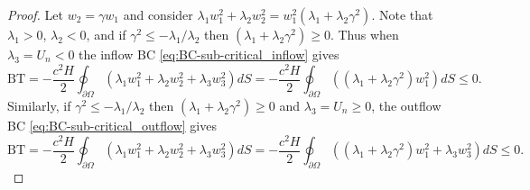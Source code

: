 \documentclass{article}
\numberwithin{equation}{section}
\newtheorem{lemma}{Lemma}
\theoremstyle{definition}
\begin{document}
\begin{proof}
   Let  $w_2 = \gamma w_1$ and consider
        $ \lambda_1 w_1^2 + \lambda_2 w_2^2     =  w_1^2 \left( \lambda_1  + \lambda_2 \gamma^2\right).$
    Note that $\lambda_1>0$, $\lambda_2<0$, and if  $ \gamma^2 \le -\lambda_1/\lambda_2$ then  $\left( \lambda_1  + \lambda_2 \gamma^2\right)\ge 0$. Thus when $\lambda_3 = U_n <0$ the inflow BC \eqref{eq:BC-sub-critical_inflow} gives
    $$
    \mathrm{BT}=-\frac{c^2H}{2}\oint_{\partial \Omega}
\left(\lambda_1 w_1^2 + \lambda_2 w_2^2 + \lambda_3 w_3^2 \right)dS =  -\frac{c^2H}{2}\oint_{\partial \Omega}
\left(\left( \lambda_1  + \lambda_2 \gamma^2\right) w_1^2\right)dS \le 0.
    $$
    Similarly, if  $ \gamma^2 \le -\lambda_1/\lambda_2$ then  $\left( \lambda_1  + \lambda_2 \gamma^2\right)\ge 0$ and  $\lambda_3 = U_n \ge 0$, the outflow BC \eqref{eq:BC-sub-critical_outflow} gives
     $$
    \mathrm{BT}=-\frac{c^2H}{2}\oint_{\partial \Omega}
\left(\lambda_1 w_1^2 + \lambda_2 w_2^2 + \lambda_3 w_3^2 \right)dS =  -\frac{c^2H}{2}\oint_{\partial \Omega}
\left( \left( \lambda_1  + \lambda_2 \gamma^2\right) w_1^2 + \lambda_3 w_3^2\right)dS \le 0.$$
\end{proof}
\end{document}
